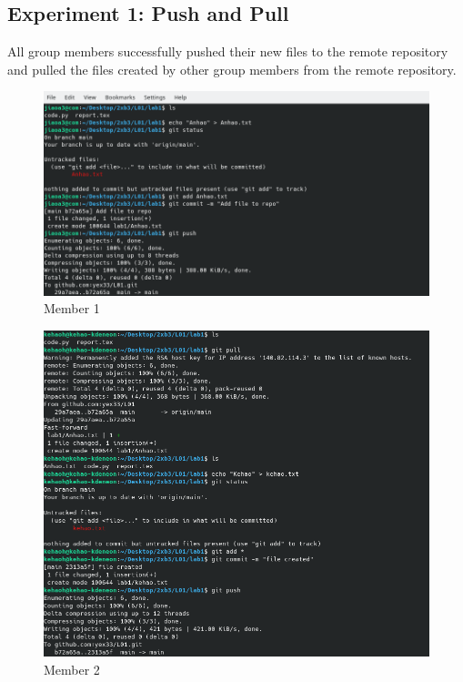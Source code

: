 \documentclass[titlepage, 12pt]{article}
\begin{document}
\subsection{Experiment 1: Push and Pull}
All group members successfully pushed their new files to the remote repository
and pulled the files created by other group members from the remote repository.
\begin{figure}[h]
  \includegraphics[width=\textwidth]{e1m1}
  \caption{Member 1}
\end{figure}
\begin{figure}[h]
  \includegraphics[width=\textwidth]{e1m2}
  \caption{Member 2}
\end{figure}
\end{document}
